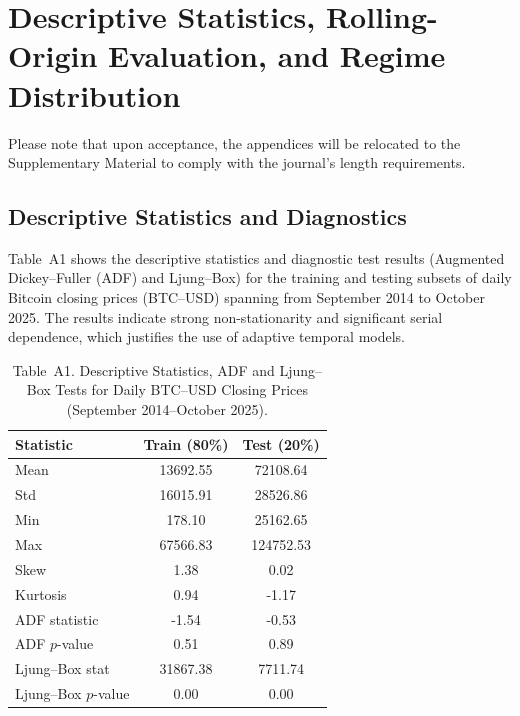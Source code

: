 \section{Descriptive Statistics, Rolling-Origin Evaluation, and Regime Distribution}
Please note that upon acceptance, the appendices will be relocated to the Supplementary Material to comply with the journal's length requirements.

\subsection{Descriptive Statistics and Diagnostics}
\label{sec:descriptive_statistics}

Table~A1 shows the descriptive statistics and diagnostic test results (Augmented Dickey--Fuller (ADF) and Ljung--Box) for the training and testing subsets of daily Bitcoin closing prices (BTC--USD) spanning from September 2014 to October 2025. The results indicate strong non-stationarity and significant serial dependence, which justifies the use of adaptive temporal models.

\begin{table}[H]
\centering
\caption{Table~A1. Descriptive Statistics, ADF and Ljung--Box Tests for Daily BTC--USD Closing Prices (September 2014--October 2025).}
\label{tab:descriptive_stats_vertical_appendix}
\setlength{\tabcolsep}{6pt}
\renewcommand{\arraystretch}{1.05}
\begin{tabular}{lcc}
\toprule
\textbf{Statistic} & \textbf{Train (80\%)} & \textbf{Test (20\%)} \\
\midrule
Mean              & 13692.55   & 72108.64  \\
Std               & 16015.91   & 28526.86   \\
Min               & 178.10   & 25162.65  \\
Max               & 67566.83   & 124752.53  \\
Skew              & 1.38     & 0.02     \\
Kurtosis          & 0.94    & -1.17    \\
ADF statistic     & -1.54     & -0.53     \\
ADF $p$-value     & 0.51     & 0.89     \\
Ljung--Box stat   & 31867.38  & 7711.74  \\
Ljung--Box $p$-value & 0.00 & 0.00 \\
\bottomrule
\end{tabular}
\end{table}

